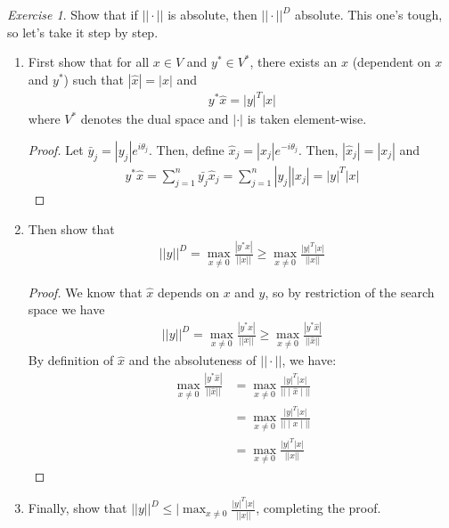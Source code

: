 \documentclass[11pt]{article}
\theoremstyle{plain}
\theoremstyle{definition}
\theoremstyle{remark}
\newtheorem{exc}{Exercise}[section]
\begin{document}
\begin{exc}
    Show that if $||\cdot||$ is absolute, then $||\cdot||^D$ absolute. This one's tough, so let's take it step by step.
    \begin{enumerate}
        \item First show that for all $x \in V$ and $y^* \in V^*$, there exists an $\hat{x}$ (dependent on $x$ and $y^*$) such that $|\hat{x}| = |x|$ and
        \begin{align*}
            y^* \hat{x} = |y|^T |x|
        \end{align*}
        where $V^*$ denotes the dual space and $|\cdot|$ is taken element-wise.
        \begin{proof}
            Let $\bar{y}_j = |y_j|e^{i \theta_j}$. Then, define $\hat{x}_j = |x_j| e^{-i\theta_j}$. Then, $|\hat{x}_j| = |x_j|$ and 
            \begin{align*}
                y^* \hat{x} = \sum_{j=1}^n \bar{y_j} \hat{x}_j = \sum_{j=1}^n |y_j| |x_j| = |y|^T |x|
            \end{align*}
        \end{proof}
        \item Then show that
        \begin{align*}
            ||y||^D = \max_{x \neq 0} \frac{|y^* x|}{||x||} \geq \max_{x \neq 0} \frac{|y|^T |x|}{||x||}
        \end{align*}
        \begin{proof}
            We know that $\hat{x}$ depends on $x$ and $y$, so by restriction of the search space we have
            \begin{align*}
                ||y||^D = \max_{x \neq 0} \frac{|y^* x|}{||x||} \geq \max_{x \neq 0} \frac{|y^* \hat{x}|}{||\hat{x}||}
            \end{align*}
            By definition of $\hat{x}$ and the absoluteness of $||\cdot||$, we have:
            \begin{align*}
                \max_{x \neq 0} \frac{|y^* \hat{x}|}{||\hat{x}||} &= \max_{x \neq 0} \frac{|y|^T |x|}{|| \mid \hat{x} \mid ||}\\
                &= \max_{x \neq 0} \frac{|y|^T |x|}{|| \mid x \mid ||}\\
                &= \max_{x \neq 0} \frac{|y|^T |x|}{|| x ||}
            \end{align*}
        \end{proof}
        \item Finally, show that $||y||^D\leq |\max_{x \neq 0} \frac{|y|^T |x|}{||x||}$, completing the proof.

\end{enumerate}
\end{exc}
\end{document}
